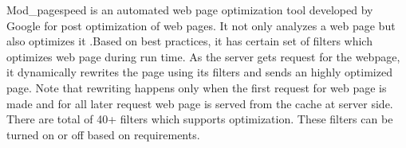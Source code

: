 \documentclass[a4paper,10pt]{IEEEtran}
\begin{document}
Mod\_pagespeed is an automated web page optimization tool developed by Google for post
optimization of web pages. It not only
analyzes a web page but also optimizes it .Based on best practices, it has
certain set of filters which optimizes web page during run time. As the server
gets request for the webpage, it dynamically rewrites the page using its filters
and sends an highly optimized page. Note that rewriting happens only when the first
request for web page is made and for all later request web page is served from the cache
at server side. There are total of 40+ filters which supports
optimization. These filters can be turned on or off based on requirements. 
\end{document}
